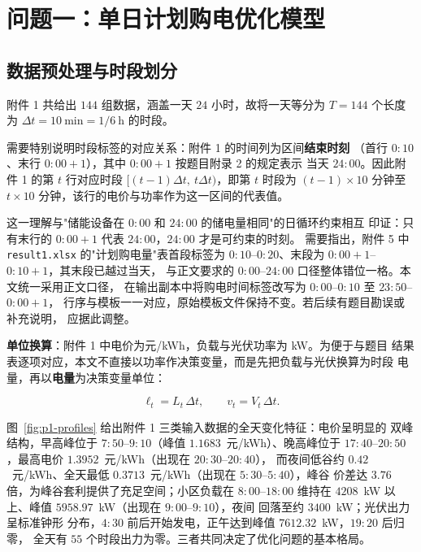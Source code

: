 \documentclass[withoutpreface,bwprint]{cumcmthesis}
\begin{document}
\section{问题一：单日计划购电优化模型}

\subsection{数据预处理与时段划分}

附件 1 共给出 $144$ 组数据，涵盖一天 $24$ 小时，故将一天等分为
$T = 144$ 个长度为 $\Delta t = 10\ \text{min} = 1/6\ \text{h}$ 的时段。

需要特别说明时段标签的对应关系：附件 1 的时间列为区间\textbf{结束时刻}
（首行 $0{:}10$、末行 $0{:}00{+}1$），其中 $0{:}00{+}1$ 按题目附录 2 的规定表示
当天 $24{:}00$。因此附件 1 的第 $t$ 行对应时段
$[(t-1)\Delta t,\ t\Delta t)$，即第 $t$ 时段为 $(t-1)\times 10$ 分钟至
$t \times 10$ 分钟，该行的电价与功率作为这一区间的代表值。

这一理解与"储能设备在 $0{:}00$ 和 $24{:}00$ 的储电量相同"的日循环约束相互
印证：只有末行的 $0{:}00{+}1$ 代表 $24{:}00$，$24{:}00$ 才是可约束的时刻。
需要指出，附件 5 中 \texttt{result1.xlsx} 的"计划购电量"表首段标签为
$0{:}10$--$0{:}20$、末段为 $0{:}00{+}1$--$0{:}10{+}1$，其末段已越过当天，
与正文要求的 $0{:}00$--$24{:}00$ 口径整体错位一格。本文统一采用正文口径，
在输出副本中将购电时间标签改写为 $0{:}00$--$0{:}10$ 至 $23{:}50$--$0{:}00{+}1$，
行序与模板一一对应，原始模板文件保持不变。若后续有题目勘误或补充说明，
应据此调整。

\textbf{单位换算}：附件 1 中电价为元/kWh，负载与光伏功率为 kW。为便于与题目
结果表逐项对应，本文不直接以功率作决策变量，而是先把负载与光伏换算为时段
电量，再以\textbf{电量}为决策变量单位：

\begin{equation}
  \ell_t = L_t\,\Delta t, \qquad v_t = V_t\,\Delta t .
  \label{eq:unit}
\end{equation}

图~\ref{fig:p1-profiles} 给出附件 1 三类输入数据的全天变化特征：电价呈明显的
双峰结构，早高峰位于 $7{:}50$--$9{:}10$（峰值 $1.1683$~元/kWh）、晚高峰位于
$17{:}40$--$20{:}50$，最高电价 $1.3952$~元/kWh（出现在 $20{:}30$--$20{:}40$），
而夜间低谷约 $0.42$~元/kWh、全天最低 $0.3713$~元/kWh（出现在
$5{:}30$--$5{:}40$），峰谷
价差达 $3.76$ 倍，为峰谷套利提供了充足空间；小区负载在 $8{:}00$--$18{:}00$
维持在 $4208$~kW 以上、峰值 $5958.97$~kW（出现在 $9{:}00$--$9{:}10$），夜间
回落至约 $3400$~kW；光伏出力呈标准钟形
分布，$4{:}30$ 前后开始发电，正午达到峰值 $7612.32$~kW，$19{:}20$ 后归零，
全天有 $55$ 个时段出力为零。三者共同决定了优化问题的基本格局。
\end{document}
